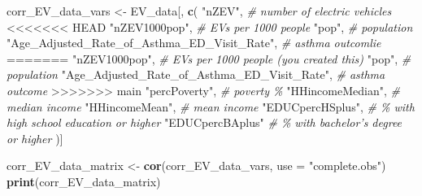 \documentclass[
]{article}
\newenvironment{Shaded}{\begin{snugshade}}{\end{snugshade}}
\newcommand{\AttributeTok}[1]{\textcolor[rgb]{0.13,0.29,0.53}{#1}}
\newcommand{\CommentTok}[1]{\textcolor[rgb]{0.56,0.35,0.01}{\textit{#1}}}
\newcommand{\FunctionTok}[1]{\textcolor[rgb]{0.13,0.29,0.53}{\textbf{#1}}}
\newcommand{\NormalTok}[1]{#1}
\newcommand{\OtherTok}[1]{\textcolor[rgb]{0.56,0.35,0.01}{#1}}
\newcommand{\StringTok}[1]{\textcolor[rgb]{0.31,0.60,0.02}{#1}}
\begin{document}
\begin{Shaded}
\begin{Highlighting}[]
\NormalTok{corr\_EV\_data\_vars }\OtherTok{\textless{}{-}}\NormalTok{ EV\_data[, }\FunctionTok{c}\NormalTok{(}
  \StringTok{"nZEV"}\NormalTok{,                      }\CommentTok{\# number of electric vehicles}
<<<<<<< HEAD
  \StringTok{"nZEV1000pop"}\NormalTok{,              }\CommentTok{\# EVs per 1000 people}
  \StringTok{"pop"}\NormalTok{,                      }\CommentTok{\# population}
  \StringTok{"Age\_Adjusted\_Rate\_of\_Asthma\_ED\_Visit\_Rate"}\NormalTok{,  }\CommentTok{\# asthma outcomlie}
=======
  \StringTok{"nZEV1000pop"}\NormalTok{,              }\CommentTok{\# EVs per 1000 people (you created this)}
  \StringTok{"pop"}\NormalTok{,                      }\CommentTok{\# population}
  \StringTok{"Age\_Adjusted\_Rate\_of\_Asthma\_ED\_Visit\_Rate"}\NormalTok{,  }\CommentTok{\# asthma outcome}
>>>>>>> main
  \StringTok{"percPoverty"}\NormalTok{,              }\CommentTok{\# poverty \%}
  \StringTok{"HHincomeMedian"}\NormalTok{,           }\CommentTok{\# median income}
  \StringTok{"HHincomeMean"}\NormalTok{,             }\CommentTok{\# mean income}
  \StringTok{"EDUCpercHSplus"}\NormalTok{,           }\CommentTok{\# \% with high school education or higher}
  \StringTok{"EDUCpercBAplus"}            \CommentTok{\# \% with bachelor’s degree or higher}
\NormalTok{)]}

\NormalTok{corr\_EV\_data\_matrix }\OtherTok{\textless{}{-}} \FunctionTok{cor}\NormalTok{(corr\_EV\_data\_vars, }\AttributeTok{use =} \StringTok{"complete.obs"}\NormalTok{)}
\FunctionTok{print}\NormalTok{(corr\_EV\_data\_matrix)}
\end{Highlighting}
\end{Shaded}
\end{document}
